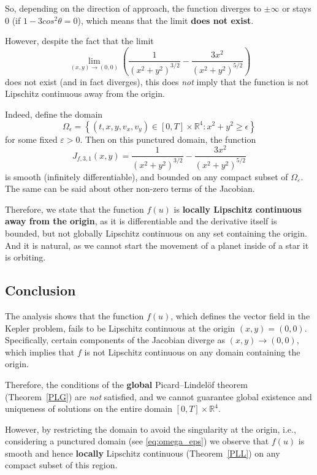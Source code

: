 \documentclass[11pt]{article}
\begin{document}
So, depending on the direction of approach, the function diverges to \( \pm\infty \) or stays 0 \newline (if $1-3cos^2 \theta=0$), which means that the limit \textbf{does not exist}. 

However, despite the fact that the limit
\[
\lim_{(x, y) \to (0, 0)} \left( \frac{1}{(x^2 + y^2)^{3/2}} - \frac{3x^2}{(x^2 + y^2)^{5/2}} \right)
\]
does not exist (and in fact diverges), this does \emph{not} imply that the function is not Lipschitz continuous away from the origin.

Indeed, define the domain
\begin{equation} \label{eq:omega_eps} \tag{*}
\Omega_{\epsilon} = \left\{ (t, x, y, v_x, v_y) \in [0,T] \times \mathbb{R}^4 : x^2 + y^2 \geq \epsilon \right\}
\end{equation}
for some fixed \( \varepsilon > 0 \). Then on this punctured domain, the function
\[
J_{f,3,1}(x, y) = \frac{1}{(x^2 + y^2)^{3/2}} - \frac{3x^2}{(x^2 + y^2)^{5/2}}
\]
is smooth (infinitely differentiable), and bounded on any compact subset of \( \Omega_\varepsilon \). The same can be said about other non-zero terms of the Jacobian.

Therefore, we state that the function $f(u)$ is \textbf{locally Lipschitz continuous away from the origin}, as it is differentiable and the derivative itself is bounded, but not globally Lipschitz continuous on any set containing the origin. And it is natural, as we cannot start the movement of a planet inside of a star it is orbiting.

\subsection*{Conclusion}
The analysis shows that the function \( f(u) \), which defines the vector field in the Kepler problem, fails to be Lipschitz continuous at the origin \( (x, y) = (0, 0) \). Specifically, certain components of the Jacobian diverge as \( (x, y) \to (0,0) \), which implies that \( f \) is not Lipschitz continuous on any domain containing the origin.

Therefore, the conditions of the \textbf{global} Picard–Lindelöf theorem (Theorem~\ref{PLG}) are \emph{not} satisfied, and we cannot guarantee global existence and uniqueness of solutions on the entire domain \( [0, T] \times \mathbb{R}^4 \).

However, by restricting the domain to avoid the singularity at the origin, i.e., considering a punctured domain (see \ref{eq:omega_eps}) we observe that \( f(u) \) is smooth and hence \textbf{locally} Lipschitz continuous (Theorem~\ref{PLL}) on any compact subset of this region.
\end{document}
